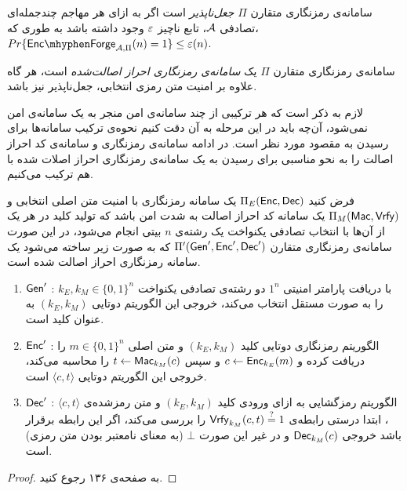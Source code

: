 \begin{definition}
	سامانه‌ی رمزنگاری متقارن 
	$\Pi$
	\textit{ جعل‌ناپذیر}
	  است اگر به ازای هر مهاجم چندجمله‌ای تصادفی 
	 $\mathcal{A}$، 
	  تابع ناچیز 
	  $\varepsilon$
	  وجود داشته باشد به طوری که، 
$Pr\{\ExpEncForge{\Adv}{\Pi}(n)  = 1\}\leq \eps(n)$.
\end{definition}

\begin{definition}
	سامانه‌ی رمزنگاری متقارن 
	$\Pi$
	یک 
	\textit{سامانه‌ی رمزنگاری احراز اصالت‌شده }
	است، هر گاه علاوه بر امنیت متن رمزی انتخابی، جعل‌ناپذیر نیز باشد.
\end{definition}
لازم به ذکر است که هر ترکیبی از چند سامانه‌ی امن منجر به یک سامانه‌ی امن نمی‌شود، آن‌چه باید در این مرحله به آن دقت کنیم نحوه‌ی ترکیب سامانه‌ها برای رسیدن به مقصود مورد نظر است. در ادامه سامانه‌ی رمزنگاری و سامانه‌ی کد احراز اصالت را به نحو مناسبی برای رسیدن به یک سامانه‌ی رمزنگاری احراز اصلات شده با هم ترکیب می‌کنیم.
\begin{theorem}
	فرض کنید 
	$\Pi_{E}(\mathsf{Enc}, \mathsf{Dec})$ 
	یک سامانه رمزنگاری با امنیت متن اصلی انتخابی و 
	$\Pi_{M}(\mathsf{Mac}, \mathsf{Vrfy})$
	یک سامانه کد احراز اصالت به شدت امن باشد که تولید کلید در هر یک از آن‌ها با انتخاب تصادفی یکنواخت یک رشته‌ی 
	$n$
	بیتی انجام می‌شود، در این صورت سامانه‌ی رمزنگاری متقارن 
	$\Pi'(\mathsf{Gen}', \mathsf{Enc}', \mathsf{Dec}')$
	که به صورت زیر ساخته می‌شود یک سامانه رمزنگاری احراز اصالت شده است. 
\begin{enumerate}
\item
$\mathsf{Gen}'$
: با دریافت پارامتر امنیتی 
$1^{n}$		
دو رشته‌ی تصادفی یکنواخت 
$k_{E}, k_{M}\in\{0, 1\}^{n}$
را به صورت مستقل انتخاب می‌کند، خروجی این الگوریتم دوتایی
$(k_{E}, k_{M})$
به عنوان کلید است.
\item
$\mathsf{Enc}'$
: الگوریتم رمزنگاری دوتایی کلید 
$(k_{E}, k_{M})$
و متن اصلی
$m\in\{0, 1\}^{n}$
را دریافت کرده و 
$c\leftarrow \mathsf{Enc}_{k_{E}}(m)$
و سپس 
$t\leftarrow \mathsf{Mac}_{k_{M}}(c)$
را محاسبه می‌کند، خروجی این الگوریتم دوتایی
$\langle c, t\rangle$
است.
\item
$\mathsf{Dec}'$
:  الگوریتم رمزگشایی به ازای ورودی کلید 
$(k_{E}, k_{M})$
و متن رمزشده‌ی 
$\langle c, t\rangle$
، ابتدا درستی رابطه‌ی 
$\mathsf{Vrfy}_{k_{M}}(c, t) \stackrel{?}{=} 1$
را بررسی می‌کند، اگر این رابطه برقرار باشد خروجی 
$\mathsf{Dec}_{k_{M}}(c)$
و در غیر این صورت 
$\bot$
 (به معنای نامعتبر بودن متن رمزی) است.
\end{enumerate}
\begin{proof}
به 
\cite{katz2014introduction}
 صفحه‌ی ۱۳۶ رجوع کنید.
\end{proof}
\end{theorem}

